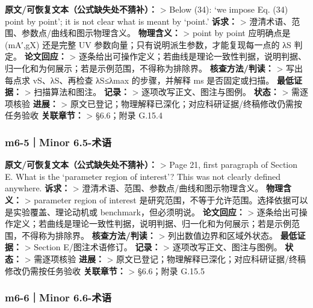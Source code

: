 \documentclass[
]{article}
\begin{document}
\textbf{原文/可恢复文本（公式缺失处不猜补）：} \textgreater{} Below
(34): `we impose Eq. (34) point by point'; it is not clear what is meant
by `point.' \textbf{诉求：} \textgreater{}
澄清术语、范围、参数点/曲线和图示物理含义。 \textbf{物理含义：}
\textgreater{} point by point 应明确点是 (mA′,gX) 还是完整 UV
参数向量；只有说明派生参数，才能复现每一点的 λS 判定。
\textbf{论文回应：} \textgreater{}
逐条给出可操作定义；若曲线是理论一致性判据，说明判据、归一化和为何展示；若是示例范围，不得称为排除界。
\textbf{核查方法/判读：} \textgreater{} 写出每点求 vS、λS、再检查
λS≤λmax 的步骤，并解释 ms 是否固定或扫描。 \textbf{最低证据：}
\textgreater{} 扫描算法和图注。 \textbf{记录：} \textgreater{}
逐项改写正文、图注与图例。 \textbf{状态：} \textgreater{} 需逐项核验
\textbf{进展：} \textgreater{}
原文已登记；物理解释已深化；对应科研证据/终稿修改仍需按任务验收
\textbf{关联章节：} \textgreater{} §6.6；附录 G.15.4

\subsubsection{m6-5｜Minor 6.5-术语}\label{m6-5minor-6.5-ux672fux8bed}

\textbf{原文/可恢复文本（公式缺失处不猜补）：} \textgreater{} Page 21,
first paragraph of Section E. What is the `parameter region of
interest'? This was not clearly defined anywhere. \textbf{诉求：}
\textgreater{} 澄清术语、范围、参数点/曲线和图示物理含义。
\textbf{物理含义：} \textgreater{} parameter region of interest
是研究范围，不等于允许范围。选择依据可以是实验覆盖、理论动机或
benchmark，但必须明说。 \textbf{论文回应：} \textgreater{}
逐条给出可操作定义；若曲线是理论一致性判据，说明判据、归一化和为何展示；若是示例范围，不得称为排除界。
\textbf{核查方法/判读：} \textgreater{} 列出数值边界和区域外状态。
\textbf{最低证据：} \textgreater{} Section E/图注术语修订。
\textbf{记录：} \textgreater{} 逐项改写正文、图注与图例。
\textbf{状态：} \textgreater{} 需逐项核验 \textbf{进展：} \textgreater{}
原文已登记；物理解释已深化；对应科研证据/终稿修改仍需按任务验收
\textbf{关联章节：} \textgreater{} §6.6；附录 G.15.5

\subsubsection{m6-6｜Minor 6.6-术语}\label{m6-6minor-6.6-ux672fux8bed}
\end{document}
